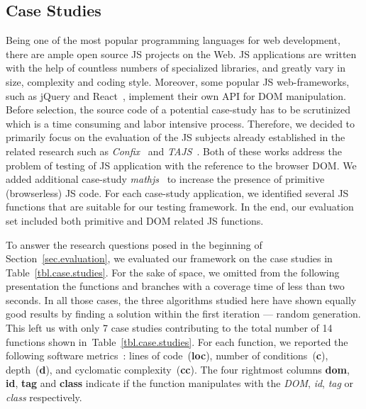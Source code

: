 \subsection{Case Studies}
\label{sub.sec.case.studies}



Being one of the most popular programming languages for web development, there are ample open source JS projects on the Web. JS applications are written with the help of countless numbers of specialized libraries, and greatly vary in size, complexity and coding style. Moreover, some popular JS web-frameworks, such as jQuery and React~\cite{todomvc}, implement their own API for DOM manipulation. Before selection, the source code of a potential case-study has to be scrutinized which is a time consuming and labor intensive process. Therefore, we decided to primarily focus on the evaluation of the JS subjects already established in the related research such as \emph{Confix}~\cite{amin:ase15} and \emph{TAJS}~\cite{dom2011, tajsbenchmarks}. Both of these works address the problem of testing of JS application with the reference to the browser DOM. We added additional case-study \emph{mathjs}~\cite{mathjs} to increase the presence of primitive (browserless) JS code. For each case-study application, we identified several JS functions that are suitable for our testing framework. In the end, our evaluation set included both primitive and DOM related JS functions.

To answer the research questions posed in the beginning of Section~\ref{sec.evaluation}, we evaluated our framework on the case studies in Table~\ref{tbl.case.studies}. For the sake of space, we omitted from the following presentation the functions and branches with a coverage time of less than two seconds. In all those cases, the three algorithms studied here have shown equally good results by finding a solution within the first iteration --- random generation. This left us with only 7 case studies contributing to the total number of 14 functions  shown in~Table~\ref{tbl.case.studies}. For each function, we reported the following software metrics~\cite{jsmeter}: lines of code~(\textbf{loc}), number of conditions~(\textbf{c}), depth~(\textbf{d}), and cyclomatic complexity~(\textbf{cc}). The four rightmost columns \textbf{dom}, \textbf{id}, \textbf{tag} and \textbf{class} indicate if the function manipulates with the \emph{DOM}, \emph{id}, \emph{tag} or \emph{class} respectively.

